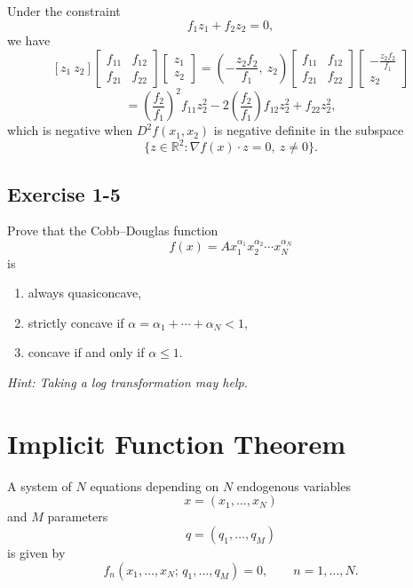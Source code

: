 Under the constraint
\[
f_1 z_1 + f_2 z_2 = 0,
\]
we have
\[
[z_1 \ z_2]
\begin{bmatrix}
f_{11} & f_{12} \\
f_{21} & f_{22}
\end{bmatrix}
\begin{bmatrix}
z_1 \\ z_2
\end{bmatrix}
=
\left(-\frac{z_2 f_2}{f_1},\ z_2\right)
\begin{bmatrix}
f_{11} & f_{12} \\
f_{21} & f_{22}
\end{bmatrix}
\begin{bmatrix}
-\frac{z_2 f_2}{f_1} \\ z_2
\end{bmatrix}
\]
\[
=
\left(\frac{f_2}{f_1}\right)^2 f_{11} z_2^2
-2\left(\frac{f_2}{f_1}\right) f_{12} z_2^2
+ f_{22} z_2^2,
\]
which is negative when $D^2 f(x_1,x_2)$ is negative definite in the subspace
\[
\{z \in \mathbb{R}^2 : \nabla f(x)\cdot z = 0,\ z\ne 0\}.
\]

\begin{tcolorbox}[breakable]

\subsection*{Exercise 1-5}

Prove that the Cobb--Douglas function
\[
f(x) = A x_1^{\alpha_1} x_2^{\alpha_2} \cdots x_N^{\alpha_N}
\]
is

\begin{enumerate}
    \item[(i)] always quasiconcave,
    \item[(ii)] strictly concave if $\alpha = \alpha_1+\cdots+\alpha_N < 1$,
    \item[(iii)] concave if and only if $\alpha \le 1$.
\end{enumerate}

\textit{Hint: Taking a log transformation may help.}

\end{tcolorbox}


\section{Implicit Function Theorem}

A system of $N$ equations depending on $N$ endogenous variables
\[
x = (x_1,\dots,x_N)
\]
and $M$ parameters
\[
q = (q_1,\dots,q_M)
\]
is given by
\[
f_n(x_1,\dots,x_N;\, q_1,\dots,q_M)=0,
\qquad n=1,\dots,N.
\]



